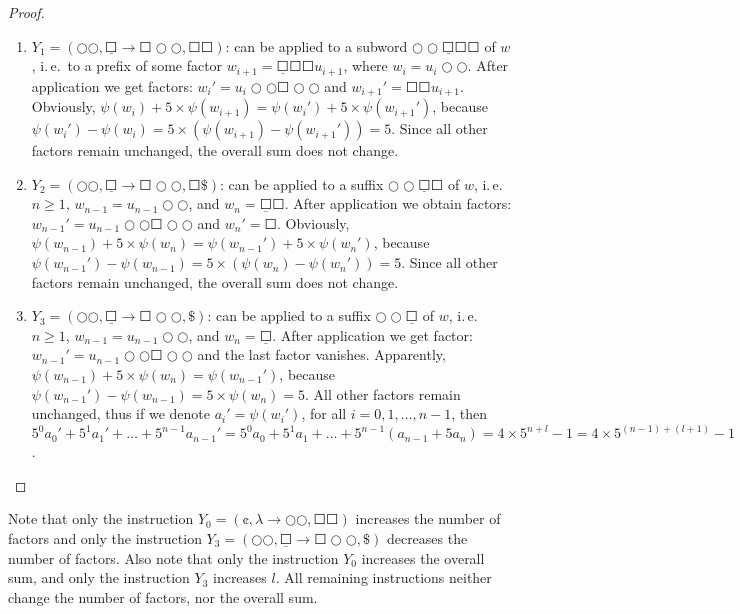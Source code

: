 \begin{proof}
\begin{enumerate}
\item $Y_1 = (\Circle \Circle, \underline{\Square} \to \Square \Circle \Circle, \Square \Square)$: can be applied to a subword $\Circle \Circle \underline{\Square} \Square \Square$ of $w$, i.\,e.\ to a prefix of some factor $w_{i+1} = \underline{\Square} \Square \Square u_{i+1}$, where $w_i = u_i \Circle \Circle$. After application we get factors: $w_i' = u_i \Circle \Circle \Square \Circle \Circle$ and $w_{i+1}' = \Square \Square u_{i+1}$. Obviously, $\psi(w_i) + 5 \times \psi(w_{i+1}) = \psi(w_i') + 5 \times \psi(w_{i+1}')$, because $\psi(w_i') - \psi(w_i) = 5 \times (\psi(w_{i+1}) - \psi(w_{i+1}')) = 5$. Since all other factors remain unchanged, the overall sum does not change.
\item $Y_2 = (\Circle \Circle, \underline{\Square} \to \Square \Circle \Circle, \Square \$)$: can be applied to a suffix $\Circle \Circle \underline{\Square} \Square$ of $w$, i.\,e.\ $n \ge 1$, $w_{n-1} = u_{n-1} \Circle \Circle$, and $w_n = \underline{\Square} \Square$. After application we obtain factors: $w_{n-1}' = u_{n-1} \Circle \Circle \Square \Circle \Circle$ and $w_n' = \Square$. Obviously, $\psi(w_{n-1}) + 5 \times \psi(w_n) = \psi(w_{n-1}') + 5 \times \psi(w_n')$, because $\psi(w_{n-1}') - \psi(w_{n-1}) = 5 \times (\psi(w_n) - \psi(w_n')) = 5$. Since all other factors remain unchanged, the overall sum does not change.
\item $Y_3 = (\Circle \Circle, \underline{\Square} \to \Square \Circle \Circle, \$)$: can be applied to a suffix $\Circle \Circle \underline{\Square}$ of $w$, i.\,e.\ $n \ge 1$, $w_{n-1} = u_{n-1} \Circle \Circle$, and $w_n = \underline{\Square}$. After application we get factor: $w_{n-1}' = u_{n-1} \Circle \Circle \Square \Circle \Circle$ and the last factor vanishes. Apparently, $\psi(w_{n-1}) + 5 \times \psi(w_n) = \psi(w_{n-1}')$, because $\psi(w_{n-1}') - \psi(w_{n-1}) = 5 \times \psi(w_n) = 5$. All other factors remain unchanged, thus if we denote $a_i' = \psi(w_i')$, for all $i = 0, 1, \ldots, n-1$, then $5^0 a_0' + 5^1 a_1' + \ldots + 5^{n-1} a_{n-1}' = 5^0 a_0 + 5^1 a_1 + \ldots + 5^{n-1} (a_{n-1} + 5a_n) = 4 \times 5^{n+l} - 1 = 4 \times 5^{(n-1)+(l+1)} - 1$.
\end{enumerate}
\end{proof}

Note that only the instruction $Y_0 = (\cent, \lambda \to \Circle \Circle, \Square \Square)$ increases the number of factors and only the instruction $Y_3 = (\Circle \Circle, \underline{\Square} \to \Square \Circle \Circle, \$)$ decreases the number of factors. Also note that only the instruction $Y_0$ increases the overall sum, and only the instruction $Y_3$ increases $l$. All remaining instructions neither change the number of factors, nor the overall sum.

